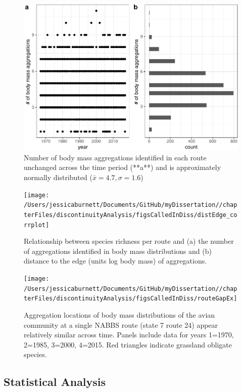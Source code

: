 \documentclass[12pt,twoside,openany]{reedthesis}
\begin{document}
\begin{figure}[bth]

{\centering \includegraphics[width=0.85\linewidth]{_myDissertation_files/figure-latex/nAggsPerYear-1} 

}

\caption{Number of body mass aggregations identified in each route unchanged across the time period (**a**) and is approximately normally distributed ($\bar{x} =  4.7, \sigma = 1.6$)}\label{fig:nAggsPerYear}
\end{figure}
\begin{figure}[bth]

{\centering \texttt{[image: /Users/jessicaburnett/Documents/GitHub/myDissertation//chapterFiles/discontinuityAnalysis/figsCalledInDiss/distEdge\_corrplot]} 

}

\caption{Relationship between species richness per route and (a) the number of aggregations identified in body mass distributions and (b) distance to the edge (units log body mass) of aggregations.}\label{fig:aggEdgeCorrPlot}
\end{figure}
\begin{figure}[bth]

{\centering \texttt{[image: /Users/jessicaburnett/Documents/GitHub/myDissertation//chapterFiles/discontinuityAnalysis/figsCalledInDiss/routeGapEx]} 

}

\caption{Aggregation locations of body mass distributions of the avian community at a single NABBS route (state 7 route 24) appear relatively similar across time. Panels include data for years 1=1970, 2=1985, 3=2000, 4=2015. Red triangles indicate grassland obligate species.}\label{fig:routeGapEx}
\end{figure}
\hypertarget{statistical-analysis-1}{%
\subsection{Statistical Analysis}\label{statistical-analysis-1}}
\end{document}
